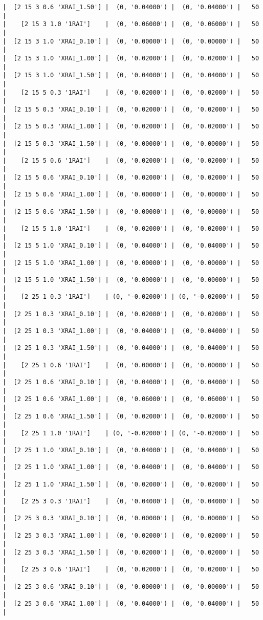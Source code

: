 \documentclass{article}
\begin{document}
\begin{verbatim}
|  [2 15 3 0.6 'XRAI_1.50'] |  (0, '0.04000') |  (0, '0.04000') |   50  |
|    [2 15 3 1.0 '1RAI']    |  (0, '0.06000') |  (0, '0.06000') |   50  |
|  [2 15 3 1.0 'XRAI_0.10'] |  (0, '0.00000') |  (0, '0.00000') |   50  |
|  [2 15 3 1.0 'XRAI_1.00'] |  (0, '0.02000') |  (0, '0.02000') |   50  |
|  [2 15 3 1.0 'XRAI_1.50'] |  (0, '0.04000') |  (0, '0.04000') |   50  |
|    [2 15 5 0.3 '1RAI']    |  (0, '0.02000') |  (0, '0.02000') |   50  |
|  [2 15 5 0.3 'XRAI_0.10'] |  (0, '0.02000') |  (0, '0.02000') |   50  |
|  [2 15 5 0.3 'XRAI_1.00'] |  (0, '0.02000') |  (0, '0.02000') |   50  |
|  [2 15 5 0.3 'XRAI_1.50'] |  (0, '0.00000') |  (0, '0.00000') |   50  |
|    [2 15 5 0.6 '1RAI']    |  (0, '0.02000') |  (0, '0.02000') |   50  |
|  [2 15 5 0.6 'XRAI_0.10'] |  (0, '0.02000') |  (0, '0.02000') |   50  |
|  [2 15 5 0.6 'XRAI_1.00'] |  (0, '0.00000') |  (0, '0.00000') |   50  |
|  [2 15 5 0.6 'XRAI_1.50'] |  (0, '0.00000') |  (0, '0.00000') |   50  |
|    [2 15 5 1.0 '1RAI']    |  (0, '0.02000') |  (0, '0.02000') |   50  |
|  [2 15 5 1.0 'XRAI_0.10'] |  (0, '0.04000') |  (0, '0.04000') |   50  |
|  [2 15 5 1.0 'XRAI_1.00'] |  (0, '0.00000') |  (0, '0.00000') |   50  |
|  [2 15 5 1.0 'XRAI_1.50'] |  (0, '0.00000') |  (0, '0.00000') |   50  |
|    [2 25 1 0.3 '1RAI']    | (0, '-0.02000') | (0, '-0.02000') |   50  |
|  [2 25 1 0.3 'XRAI_0.10'] |  (0, '0.02000') |  (0, '0.02000') |   50  |
|  [2 25 1 0.3 'XRAI_1.00'] |  (0, '0.04000') |  (0, '0.04000') |   50  |
|  [2 25 1 0.3 'XRAI_1.50'] |  (0, '0.04000') |  (0, '0.04000') |   50  |
|    [2 25 1 0.6 '1RAI']    |  (0, '0.00000') |  (0, '0.00000') |   50  |
|  [2 25 1 0.6 'XRAI_0.10'] |  (0, '0.04000') |  (0, '0.04000') |   50  |
|  [2 25 1 0.6 'XRAI_1.00'] |  (0, '0.06000') |  (0, '0.06000') |   50  |
|  [2 25 1 0.6 'XRAI_1.50'] |  (0, '0.02000') |  (0, '0.02000') |   50  |
|    [2 25 1 1.0 '1RAI']    | (0, '-0.02000') | (0, '-0.02000') |   50  |
|  [2 25 1 1.0 'XRAI_0.10'] |  (0, '0.04000') |  (0, '0.04000') |   50  |
|  [2 25 1 1.0 'XRAI_1.00'] |  (0, '0.04000') |  (0, '0.04000') |   50  |
|  [2 25 1 1.0 'XRAI_1.50'] |  (0, '0.02000') |  (0, '0.02000') |   50  |
|    [2 25 3 0.3 '1RAI']    |  (0, '0.04000') |  (0, '0.04000') |   50  |
|  [2 25 3 0.3 'XRAI_0.10'] |  (0, '0.00000') |  (0, '0.00000') |   50  |
|  [2 25 3 0.3 'XRAI_1.00'] |  (0, '0.02000') |  (0, '0.02000') |   50  |
|  [2 25 3 0.3 'XRAI_1.50'] |  (0, '0.02000') |  (0, '0.02000') |   50  |
|    [2 25 3 0.6 '1RAI']    |  (0, '0.02000') |  (0, '0.02000') |   50  |
|  [2 25 3 0.6 'XRAI_0.10'] |  (0, '0.00000') |  (0, '0.00000') |   50  |
|  [2 25 3 0.6 'XRAI_1.00'] |  (0, '0.04000') |  (0, '0.04000') |   50  |

\end{verbatim}
\end{document}
